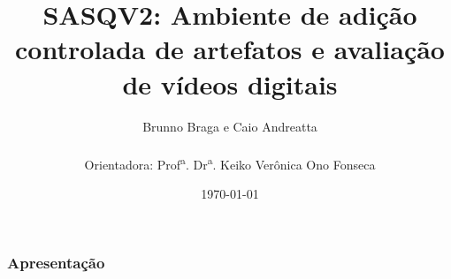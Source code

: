 \documentclass{beamer}
\title[First!]{SASQV2: Ambiente de adição controlada de artefatos e avaliação de vídeos digitais}
\author{Brunno Braga e Caio Andreatta \\ ~ \\ Orientadora: Prof\textsuperscript{a}. Dr\textsuperscript{a}. Keiko Verônica Ono Fonseca}
\institute{Universidade Tecnológica Federal do Paraná}
\date{\today}
\begin{document}
\begin{frame}
    \titlepage{ }
\end{frame}

\begin{frame}
    \frametitle{Apresentação}
    \setcounter{tocdepth}{1}
    \tableofcontents
\end{frame}










\end{document}
